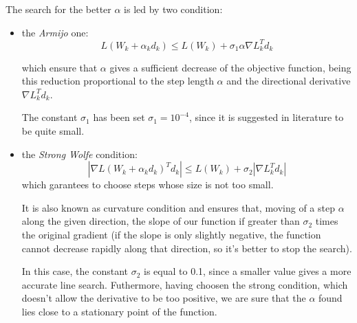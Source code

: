			The search for the better $\alpha$ is led by two condition:
			\begin{itemize}
			\item the \textit{Armijo} one:
			\begin{equation}
			\textit{L}(W_k+\alpha _kd_k)\leq \textit{L}(W_k)+\sigma_1\alpha\nabla \textit{L}_k^Td_k
			\end{equation}

			which ensure that $\alpha$ gives a sufficient decrease of the objective function, being this reduction proportional to the step length $\alpha$ and the directional derivative $\nabla \textit{L}_k^Td_k$.

			The constant $\sigma_1$ has been set $\sigma_1=10^{-4}$, since it is suggested in literature to be quite small.

			\item the \textit{Strong Wolfe} condition:
			\begin{equation}
			|\nabla \textit{L}(W_k+\alpha _kd_k)^Td_k|\leq \textit{L}(W_k)+\sigma_2|\nabla \textit{L}_k^Td_k|
			\end{equation}
			which garantees to choose steps whose size is not too small.

			It is also known as curvature condition and ensures that, moving of a step $\alpha$ along the given direction, the slope of our function if greater than $\sigma_2$ times the original gradient (if the slope is only slightly negative, the function cannot decrease rapidly along that direction, so it's better to stop the search).

			In this case, the constant $\sigma_2$ is equal to 0.1, since a smaller value gives a more accurate line search.
			Futhermore, having choosen the strong condition, which doesn't allow the derivative to be too positive, we are sure that the $\alpha$ found lies close to a stationary point of the function.
			\end{itemize}

